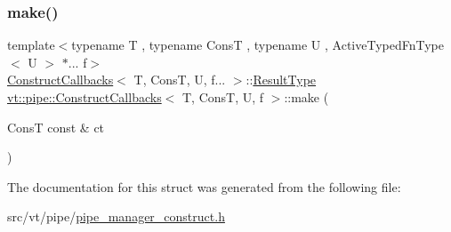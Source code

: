 \subsubsection{\texorpdfstring{make()}{make()}}
{\footnotesize\ttfamily template$<$typename T , typename ConsT , typename U , Active\+Typed\+Fn\+Type$<$ U $>$ $\ast$... f$>$ \\
\hyperlink{structvt_1_1pipe_1_1_construct_callbacks}{Construct\+Callbacks}$<$ T, ConsT, U, f... $>$\+::\hyperlink{structvt_1_1pipe_1_1_construct_callbacks_afadffbdf96d7bf4f83498ef255815119}{Result\+Type} \hyperlink{structvt_1_1pipe_1_1_construct_callbacks}{vt\+::pipe\+::\+Construct\+Callbacks}$<$ T, ConsT, U, f $>$\+::make (\begin{DoxyParamCaption}\item[{ConsT const \&}]{ct }\end{DoxyParamCaption})\hspace{0.3cm}{\ttfamily [static]}}



The documentation for this struct was generated from the following file\+:\begin{DoxyCompactItemize}
\item 
src/vt/pipe/\hyperlink{pipe__manager__construct_8h}{pipe\+\_\+manager\+\_\+construct.\+h}\end{DoxyCompactItemize}
